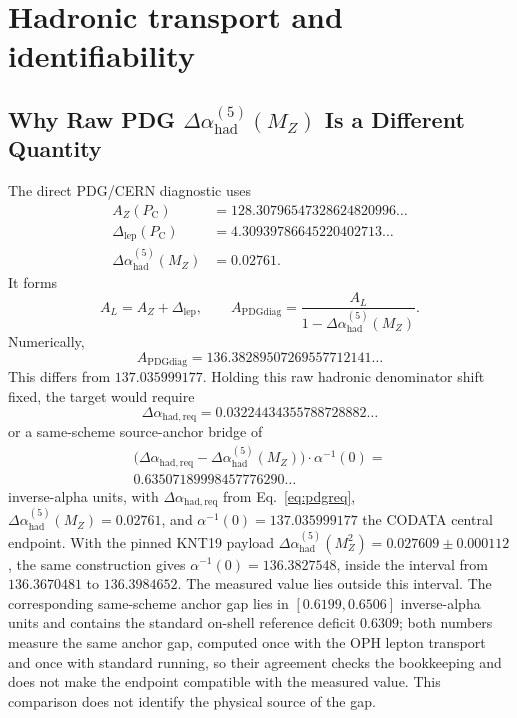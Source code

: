 \documentclass[11pt]{article}
\theoremstyle{remark}
\newcommand{\alphainv}{\alpha^{-1}}
\newcommand{\AZ}{A_Z}
\newcommand{\Ppub}{P_{\mathrm C}}
\newcommand{\Dlep}{\Delta_{\mathrm{lep}}}
\begin{document}
\section{Hadronic transport and identifiability}
\subsection{Why Raw PDG \(\Delta\alpha_{\mathrm{had}}^{(5)}(M_Z)\) Is a Different Quantity}
\label{sec:alpha-step-19}
\label{sec:pdg-step}
\label{sec:raw-pdg}

The direct PDG/CERN diagnostic uses
\begin{align}
\AZ(\Ppub)&=
128.30796547328624820996\ldots\\
\Dlep(\Ppub)&=
4.30939786645220402713\ldots\\
\Delta\alpha_{\mathrm{had}}^{(5)}(M_Z)&=0.02761.
\end{align}
It forms
\begin{equation}
A_L=\AZ+\Dlep,
\qquad
A_{\mathrm{PDGdiag}}=\frac{A_L}{1-\Delta\alpha_{\mathrm{had}}^{(5)}(M_Z)}.
\label{eq:pdgdiag}
\end{equation}
Numerically,
\begin{equation}
A_{\mathrm{PDGdiag}}
=
136.38289507269557712141\ldots
\label{eq:pdgdiagval}
\end{equation}
This differs from \(137.035999177\). Holding this raw hadronic denominator shift fixed, the target would require
\begin{equation}
\Delta\alpha_{\mathrm{had,req}}
=
0.03224434355788728882\ldots
\label{eq:pdgreq}
\end{equation}
or a same-scheme source-anchor bridge of
\begin{equation}
\begin{gathered}
\bigl(\Delta\alpha_{\mathrm{had,req}}-\Delta\alpha_{\mathrm{had}}^{(5)}(M_Z)\bigr)\cdot\alphainv(0)
=\\
0.63507189998457776290\ldots
\end{gathered}
\label{eq:bridgegap}
\end{equation}
inverse-alpha units, with \(\Delta\alpha_{\mathrm{had,req}}\) from
Eq.~\eqref{eq:pdgreq}, \(\Delta\alpha_{\mathrm{had}}^{(5)}(M_Z)=0.02761\), and
\(\alphainv(0)=137.035999177\) the CODATA central endpoint.
With the pinned KNT19 payload \(\Delta\alpha_{\mathrm{had}}^{(5)}(M_Z^2)=0.027609\pm0.000112\),
the same construction gives \(\alpha^{-1}(0)=136.3827548\), inside the interval from \(136.3670481\) to \(136.3984652\).
The measured value lies outside this interval. The corresponding same-scheme anchor gap lies in
\([0.6199,0.6506]\) inverse-alpha units and contains the standard on-shell reference deficit
\(0.6309\); both numbers measure the same anchor gap, computed once with the OPH lepton transport
and once with standard running, so their agreement checks the bookkeeping and does not make the
endpoint compatible with the measured value. This comparison does not identify the
physical source of the gap.
\end{document}
